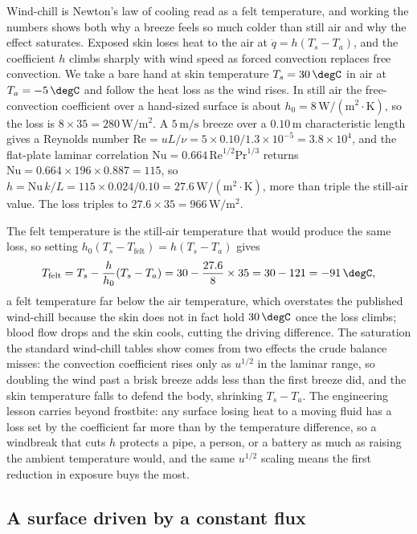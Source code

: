 Wind-chill is Newton's law of cooling read as a felt temperature, and
working the numbers shows both why a breeze feels so much colder than still
air and why the effect saturates. Exposed skin loses heat to the air at
$\dot{q} = h(T_s - T_a)$, and the coefficient $h$ climbs sharply with wind
speed as forced convection replaces free convection. We take a bare hand at
skin temperature $T_s = 30\,\degC$ in air at $T_a = -5\,\degC$ and follow
the heat loss as the wind rises. In still air the free-convection
coefficient over a hand-sized surface is about $h_0 = 8\,\text{W}/(\text{m}
^2\cdot\si{\kelvin})$, so the loss is $8\times35 = 280\,\text{W}/\text{m}^2$.
A $5\,\text{m/s}$ breeze over a $0.10\,\text{m}$ characteristic length gives
a Reynolds number $\text{Re} = uL/\nu = 5\times0.10/1.3\times10^{-5} =
3.8\times10^4$, and the flat-plate laminar correlation $\text{Nu} = 0.664\,
\text{Re}^{1/2}\text{Pr}^{1/3}$ returns $\text{Nu} = 0.664\times196\times
0.887 = 115$, so $h = \text{Nu}\,k/L = 115\times0.024/0.10 = 27.6\,\text{W}
/(\text{m}^2\cdot\si{\kelvin})$, more than triple the still-air value. The
loss triples to $27.6\times35 = 966\,\text{W}/\text{m}^2$.

The felt temperature is the still-air temperature that would produce the
same loss, so setting $h_0(T_s - T_{\text{felt}}) = h(T_s - T_a)$ gives
\[
T_{\text{felt}} = T_s - \frac{h}{h_0}(T_s - T_a) = 30 - \frac{27.6}{8}
\times35 = 30 - 121 = -91\,\degC,
\]
a felt temperature far below the air temperature, which overstates the
published wind-chill because the skin does not in fact hold $30\,\degC$
once the loss climbs; blood flow drops and the skin cools, cutting the
driving difference. The saturation the standard wind-chill tables show
comes from two effects the crude balance misses: the convection coefficient
rises only as $u^{1/2}$ in the laminar range, so doubling the wind past a
brisk breeze adds less than the first breeze did, and the skin temperature
falls to defend the body, shrinking $T_s - T_a$. The engineering lesson
carries beyond frostbite: any surface losing heat to a moving fluid has a
loss set by the coefficient far more than by the temperature difference, so
a windbreak that cuts $h$ protects a pipe, a person, or a battery as much as
raising the ambient temperature would, and the same $u^{1/2}$ scaling means
the first reduction in exposure buys the most.

\subsection{A surface driven by a constant flux}

